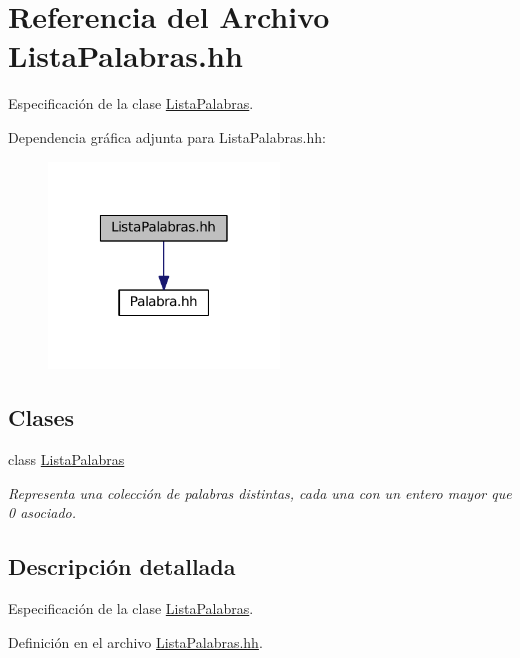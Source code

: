 \hypertarget{_lista_palabras_8hh}{\section{Referencia del Archivo Lista\-Palabras.\-hh}
\label{_lista_palabras_8hh}
}


Especificación de la clase \hyperlink{class_lista_palabras}{Lista\-Palabras}.  


Dependencia gráfica adjunta para Lista\-Palabras.\-hh\-:
\nopagebreak
\begin{figure}[H]
\begin{center}
\leavevmode
\includegraphics[width=174pt]{_lista_palabras_8hh__incl}
\end{center}
\end{figure}
\subsection*{Clases}
\begin{DoxyCompactItemize}
\item 
class \hyperlink{class_lista_palabras}{Lista\-Palabras}
\begin{DoxyCompactList}\small\item\em Representa una colección de palabras distintas, cada una con un entero mayor que 0 asociado. \end{DoxyCompactList}\end{DoxyCompactItemize}


\subsection{Descripción detallada}
Especificación de la clase \hyperlink{class_lista_palabras}{Lista\-Palabras}. 

Definición en el archivo \hyperlink{_lista_palabras_8hh_source}{Lista\-Palabras.\-hh}.

